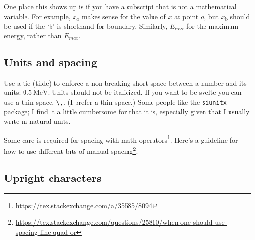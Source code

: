 One place this shows up is if you have a subscript that is not a mathematical variable. For example, $x_a$ makes sense for the value of $x$ at point $a$, but $x_\text{b}$ should be used if the `b' is shorthand for boundary. Similarly, $E_\text{max}$ for the maximum energy, rather than $E_{max}$.


\subsection{Units and spacing}

Use a tie (tilde) to enforce a non-breaking short space between a number and its units: $0.5~\text{MeV}$. Units should not be italicized. If you want to be svelte you can use a thin space, \verb!\,!. (I prefer a thin space.) Some people like the \texttt{siunitx} package; I find it a little cumbersome for that it is, especially given that I usually write in natural units.

Some care is required for spacing with math operators\footnote{\url{https://tex.stackexchange.com/a/35585/8094}}. Here's a guideline for how to use different bits of manual spacing\footnote{\url{https://tex.stackexchange.com/questions/25810/when-one-should-use-spacing-line-quad-or}}.


\subsection{Upright characters}

